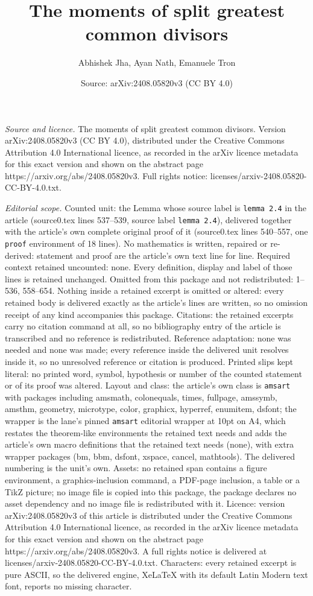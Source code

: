 \documentclass[10pt,a4paper]{amsart}
\title[The moments of split greatest common divisors]{The moments of split greatest common divisors}
\author{Abhishek Jha, Ayan Nath, Emanuele Tron}
\date{Source: arXiv:2408.05820v3 (CC BY 4.0)}
\begin{document}
\maketitle

\noindent\emph{Source and licence.} The moments of split greatest common divisors. Version arXiv:2408.05820v3 (CC BY 4.0), distributed under the Creative Commons Attribution 4.0 International licence, as recorded in the arXiv licence metadata for this exact version and shown on the abstract page https://arxiv.org/abs/2408.05820v3. Full rights notice: licenses/arxiv-2408.05820-CC-BY-4.0.txt.\par\smallskip

\noindent\textit{Editorial scope.} Counted unit: the Lemma whose source label is \texttt{lemma 2.4} in the article (source0.tex lines 537--539, source label \texttt{lemma 2.4}), delivered together with the article's own complete original proof of it (source0.tex lines 540--557, one \texttt{proof} environment of 18 lines). No mathematics is written, repaired or re-derived: statement and proof are the article's own text line for line. Required context retained uncounted: none. Every definition, display and label of those lines is retained unchanged. Omitted from this package and not redistributed: 1--536, 558--654. Nothing inside a retained excerpt is omitted or altered: every retained body is delivered exactly as the article's lines are written, so no omission receipt of any kind accompanies this package. Citations: the retained excerpts carry no citation command at all, so no bibliography entry of the article is transcribed and no reference is redistributed. Reference adaptation: none was needed and none was made; every reference inside the delivered unit resolves inside it, so no unresolved reference or citation is produced. Printed slips kept literal: no printed word, symbol, hypothesis or number of the counted statement or of its proof was altered. Layout and class: the article's own class is \texttt{amsart} with packages including amsmath, colonequals, times, fullpage, amssymb, amsthm, geometry, microtype, color, graphicx, hyperref, enumitem, dsfont; the wrapper is the lane's pinned \texttt{amsart} editorial wrapper at 10pt on A4, which restates the theorem-like environments the retained text needs and adds the article's own macro definitions that the retained text needs (none), with extra wrapper packages (bm, bbm, dsfont, xspace, cancel, mathtools). The delivered numbering is the unit's own. Assets: no retained span contains a figure environment, a graphics-inclusion command, a PDF-page inclusion, a table or a TikZ picture; no image file is copied into this package, the package declares no asset dependency and no image file is redistributed with it. Licence: version arXiv:2408.05820v3 of this article is distributed under the Creative Commons Attribution 4.0 International licence, as recorded in the arXiv licence metadata for this exact version and shown on the abstract page https://arxiv.org/abs/2408.05820v3. A full rights notice is delivered at licenses/arxiv-2408.05820-CC-BY-4.0.txt. Characters: every retained excerpt is pure ASCII, so the delivered engine, XeLaTeX with its default Latin Modern text font, reports no missing character.
\end{document}
